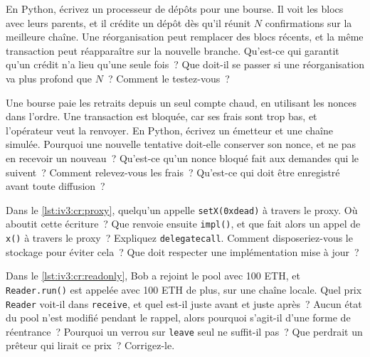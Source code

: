 \begin{question}\label{iq:iv3:smart-contracts-and-crypto-engineering:20}
En Python, écrivez un processeur de dépôts pour une bourse. Il voit les blocs avec leurs parents, et il crédite un dépôt dès qu'il réunit $N$ confirmations sur la meilleure chaîne. Une réorganisation peut remplacer des blocs récents, et la même transaction peut réapparaître sur la nouvelle branche. Qu'est-ce qui garantit qu'un crédit n'a lieu qu'une seule fois~? Que doit-il se passer si une réorganisation va plus profond que $N$~? Comment le testez-vous~?
\end{question}

\begin{question}\label{iq:iv3:smart-contracts-and-crypto-engineering:21}
Une bourse paie les retraits depuis un seul compte chaud, en utilisant les nonces dans l'ordre. Une transaction est bloquée, car ses frais sont trop bas, et l'opérateur veut la renvoyer. En Python, écrivez un émetteur et une chaîne simulée. Pourquoi une nouvelle tentative doit-elle conserver son nonce, et ne pas en recevoir un nouveau~? Qu'est-ce qu'un nonce bloqué fait aux demandes qui le suivent~? Comment relevez-vous les frais~? Qu'est-ce qui doit être enregistré avant toute diffusion~?
\end{question}

\begin{question}\label{iq:iv3:smart-contracts-and-crypto-engineering:22}
Dans le \cref{lst:iv3:cr:proxy}, quelqu'un appelle \texttt{setX(0xdead)} à travers le proxy. Où aboutit cette écriture~? Que renvoie ensuite \texttt{impl()}, et que fait alors un appel de \texttt{x()} à travers le proxy~? Expliquez \texttt{delegatecall}. Comment disposeriez-vous le stockage pour éviter cela~? Que doit respecter une implémentation mise à jour~?
\label{lst:iv3:cr:proxy}
\end{question}

\begin{question}\label{iq:iv3:smart-contracts-and-crypto-engineering:23}
Dans le \cref{lst:iv3:cr:readonly}, Bob a rejoint le pool avec 100 ETH, et \texttt{Reader.run()} est appelée avec 100 ETH de plus, sur une chaîne locale. Quel prix \texttt{Reader} voit-il dans \texttt{receive}, et quel est-il juste avant et juste après~? Aucun état du pool n'est modifié pendant le rappel, alors pourquoi s'agit-il d'une forme de réentrance~? Pourquoi un verrou sur \texttt{leave} seul ne suffit-il pas~? Que perdrait un prêteur qui lirait ce prix~? Corrigez-le.
\label{lst:iv3:cr:readonly}
\end{question}

